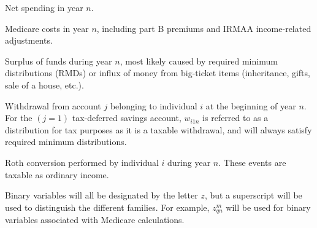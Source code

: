 \documentclass{report}[fleqn,11pt]
\begin{document}
\begin{description}[leftmargin=4em,style=multiline]
\item [$g_n$]
	Net spending in year $n$.
\item [$m_n$]
	Medicare costs in year $n$, including part B premiums and IRMAA income-related adjustments.
\item [$s_{n}$]
	Surplus of funds during year $n$, most likely caused by required minimum distributions (RMDs)
	or influx of money from big-ticket items (inheritance, gifts, sale of a house, etc.).
\item [$w_{ijn}$]
	Withdrawal from account $j$ belonging to individual $i$ at the beginning of year $n$.
	For the $(j=1)$ tax-deferred savings account, $w_{i1n}$ is referred to as a distribution for
	tax purposes as it is a taxable withdrawal, and will always satisfy required minimum distributions.
\item [$x_{in}$]
	Roth conversion performed by individual $i$ during year $n$.
	These events are taxable as ordinary income.
\item [$z_{*}^*$]
	Binary variables will all be designated by the letter $z$, but a superscript will be
	used to distinguish the different families. For example, $z_{qn}^m$ will be used
	for binary variables associated with Medicare calculations.
\end{description}
\end{document}
